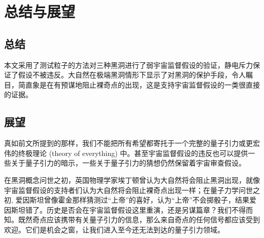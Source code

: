 \chapter{总结与展望}
\section{总结}
本文采用了测试粒子的方法对三种黑洞进行了弱宇宙监督假设的验证，静电斥力保证了假设不被违反。大自然在极端黑洞情形下显示了对黑洞的保护手段，令人瞩目，简直象是在有预谋地阻止裸奇点的出现，这是支持宇宙监督假设的一类很直接的证据。
\section{展望}
真如前文所提到的那样，我们不能把所有希望都寄托于一个完整的量子引力或更宏伟的终极理论 (theory of everything) 中。甚至宇宙监督假设的违反也可以提供一些关于量子引力的暗示，一些关于量子引力的猜想仍然保留着宇宙审查假设。

在黑洞概念问世之初，英国物理学家埃丁顿曾认为大自然将会阻止黑洞出现，就像宇宙监督假设的支持者们认为大自然将会阻止裸奇点出现一样；在量子力学问世之初, 爱因斯坦曾像霍金那样猜测过“上帝”的喜好，认为“上帝”不会掷骰子，结果爱因斯坦错了。历史是否会在宇宙监督假设这里重演，还是另谋篇章？我们不得而知。既然奇点应该携带有关量子引力的信息，那么来自奇点的任何信号都应该受到欢迎。它们是机会之窗，让我们进入至今还无法到达的量子引力领域。